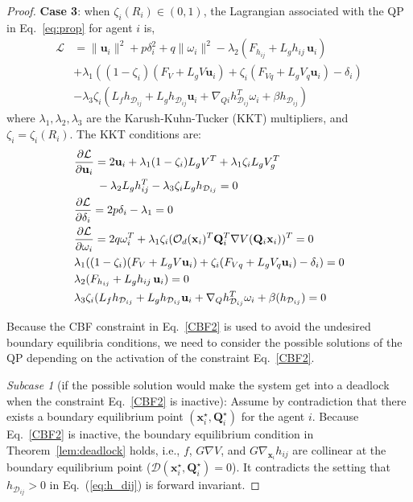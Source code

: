 \documentclass[letterpaper, 10 pt, conference]{ieeeconf}
\theoremstyle{plain}
\begin{document}
\begin{proof}
\textbf{Case 3}: when $\zeta_i(R_i) \in (0,1)$, the Lagrangian associated with the QP in Eq.~\eqref{eq:prop} for agent $i$ is,
{\footnotesize\begin{align*} 
\mathcal {L} &=  \| {\mathbf{u}_i} \|^{2} +  p \delta_i ^{2} + q  \|\omega_i  \|^ 2 - \lambda _{2} (F_{h_{ij}} + L_{g} h_{ij} \, \mathbf{u}_i)\\
&+ \lambda _{1}((1- \zeta_i) (F_{V} + L_{g} V \mathbf{u}_i) + \zeta_i (F_{Vq} + L_{g} V_q \mathbf{u}_i)- \delta_i) \\
& - \lambda_3 \zeta_i (L_f h_{\mathcal{D}_{ij}} + L_g h_{\mathcal{D}_{ij}} \mathbf{u}_i + \nabla_{Qi} h_{\mathcal{D}_{ij}}^{T} \omega_i + \beta{h_{\mathcal{D}_{ij}}})
\end{align*}}
where $\lambda_1, \lambda_2, \lambda_3$ are the Karush-Kuhn-Tucker (KKT) multipliers, and $\zeta_i = \zeta_i(R_i)$. 
The KKT conditions are:
{\footnotesize\begin{align}
&\frac {\partial \mathcal {L}}{\partial \mathbf{u}_i} = 2\mathbf{u}_i + \lambda _{1} (1-\zeta_i) L_{g} V^{{T}} + \lambda_1 \zeta_i L_g V_g^{T} \notag \\
&\quad \quad   - \lambda _{2} L_{g} h_{ij}^{{T}} - \lambda_3 \zeta_i L_gh_{\mathcal{D}_{ij}}= 0 \label{eq:kkt1} \\
&\frac {\partial \mathcal {L}}{\partial \delta_i } = 2 p \delta_i - \lambda _{1} = 0 \label{eq:delta_i} \\
&\frac {\partial \mathcal {L}}{\partial \omega_i } = 2 q \omega_i^{T} + \lambda _{1}\zeta_i(\mathcal{O}_d(\mathbf{x}_i)^{T}\mathbf{Q}_i^{T}\nabla V(\mathbf{Q}_i\mathbf{x}_i))^{T} = 0 \notag \\
& \lambda _{1}((1- \zeta_i) (F_{V} + L_{g} V \mathbf{u}_i) + \zeta_i (F_{Vq} + L_{g} V_q \mathbf{u}_i)- \delta_i) = 0 \notag \\
&\lambda _{2} (F_{h_{ij}} + L_{g} h_{ij} \,\mathbf{u}_i) = 0 \notag  \\
&\lambda_3 \zeta_i (L_f h_{\mathcal{D}_{ij}} + L_g h_{\mathcal{D}_{ij}} \mathbf{u}_i + \nabla_Q h_{\mathcal{D}_{ij}}^{T} \omega_i + \beta({h_{\mathcal{D}_{ij}}})=0 \notag
\end{align}}




Because the CBF constraint in Eq.~\eqref{CBF2} is used to avoid the undesired boundary equilibria conditions, we need to consider the possible solutions of the QP depending on the activation of the constraint Eq.~\eqref{CBF2}.


\textit{Subcase 1}
(if the possible solution would make the system get into a deadlock when the constraint Eq.~\eqref{CBF2} is inactive): Assume by contradiction that there exists a boundary equilibrium point $(\mathbf{x}_i^{\star}, \mathbf{Q}_i^{\star})$ for the agent $i$. Because Eq.~\eqref{CBF2} is inactive,
the boundary equilibrium condition in 
Theorem~\ref{lem:deadlock} \cite{reis2020control} holds, i.e., 
$f$, $G\nabla V$, and $G \nabla_{\mathbf{x}_i} h_{ij}$ are collinear at the boundary equilibrium point ($\mathcal{D}(\mathbf{x}_i^{\star}, \mathbf{Q}_i^{\star}) = 0$). It contradicts the setting that $h_{\mathcal{D}_{ij}} > 0$ in Eq.~(\ref{eq:h_dij}) is forward invariant.




\end{proof}
\end{document}
